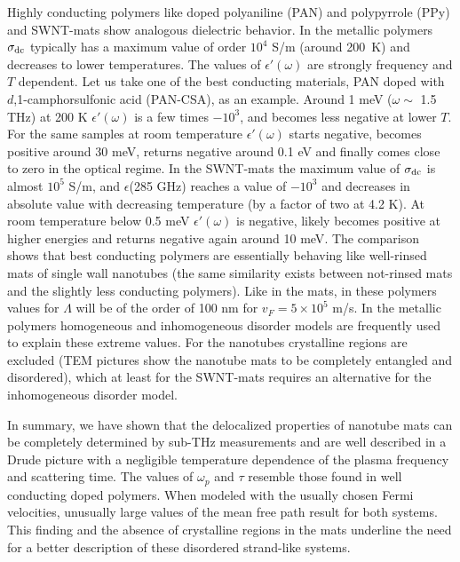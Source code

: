 \begin{multicols}{2}
Highly conducting polymers like doped polyaniline (PAN) and
polypyrrole (PPy)\cite{Lee95,Kohlman97} and SWNT-mats show analogous
dielectric behavior. In the metallic polymers $\sigma_{\rm dc}$ typically has
a maximum value of order $10^4$ S/m (around 200~K) and decreases to lower
temperatures. The values of $\epsilon'(\omega)$ are strongly frequency and
$T$ dependent. Let us take one of the best conducting materials, PAN doped
with $d$,1-camphorsulfonic acid (PAN-CSA), as an example\cite{Kohlman97}.
Around 1 meV ($\omega \sim $ 1.5 THz) at 200 K $\epsilon'(\omega)$ is a few
times $-10^3$, and becomes less negative at lower $T$. For the same samples
at room temperature $\epsilon'(\omega)$ starts negative, becomes positive
around 30 meV, returns negative around 0.1 eV and finally comes close to zero
in the optical regime. In the SWNT-mats the maximum value of $\sigma_{\rm dc}$ is almost $10^5$ S/m, and $\epsilon$(285 GHz) reaches a value of $-10^3$
and decreases in absolute value with decreasing temperature (by a factor of
two at 4.2 K). At room temperature below 0.5 meV $\epsilon'(\omega)$ is
negative, likely becomes positive at higher energies and returns negative
again around 10 meV\cite{Ugawa99,note1,Chapman99}. The comparison shows that
best conducting polymers are essentially behaving like well-rinsed mats of
single wall nanotubes (the same similarity exists between not-rinsed mats and
the slightly less conducting polymers).
Like in the mats, in these polymers values for $\Lambda$ will be of the order
of 100 nm for $v_F = 5 \times 10^5$ m/s\cite{Kohlman97}. In the metallic
polymers homogeneous and inhomogeneous disorder
models\cite{Kohlman97,Chapman99} are frequently used to explain these extreme
values. For the nanotubes crystalline regions are excluded (TEM pictures show
the nanotube mats to be completely entangled and disordered), which at least
for the SWNT-mats requires an alternative for the inhomogeneous disorder
model.

In summary, we have shown that the delocalized properties of nanotube mats
can be completely determined by sub-THz measurements and are well described
in a Drude picture with a negligible temperature dependence of the plasma
frequency and scattering time. The values of $\omega_p$ and $\tau$ resemble
those found in well conducting doped polymers. When modeled with the usually
chosen Fermi velocities, unusually large values of the mean free path result
for both systems. This finding and the absence of crystalline regions in the
mats underline the need for a better description of these disordered
strand-like systems.


\end{multicols}
